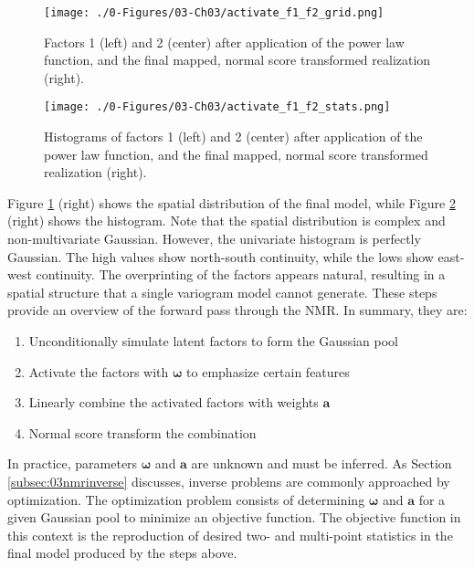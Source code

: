 \begin{figure}[htb!]
    \centering
    \texttt{[image: ./0-Figures/03-Ch03/activate\_f1\_f2\_grid.png]}
    \caption{Factors 1 (left) and 2 (center) after application of the power law function, and the final mapped, normal score transformed realization (right).}
    \label{fig:activate_f1_f2_grid}
\end{figure}

\begin{figure}[htb!]
    \centering
    \texttt{[image: ./0-Figures/03-Ch03/activate\_f1\_f2\_stats.png]}
    \caption{Histograms of factors 1 (left) and 2 (center) after application of the power law function, and the final mapped, normal score transformed realization (right).}
    \label{fig:activate_f1_f2_stats}
\end{figure}

Figure \ref{fig:activate_f1_f2_grid} (right) shows the spatial distribution of the final model, while Figure \ref{fig:activate_f1_f2_stats} (right) shows the histogram. Note that the spatial distribution is complex and non-multivariate Gaussian. However, the univariate histogram is perfectly Gaussian. The high values show north-south continuity, while the lows show east-west continuity. The overprinting of the factors appears natural, resulting in a spatial structure that a single variogram model cannot generate. These steps provide an overview of the forward pass through the \gls{NMR}. In summary, they are:
\begin{enumerate}[noitemsep]
    \item Unconditionally simulate latent factors to form the Gaussian pool
    \item Activate the factors with $\boldsymbol{\omega}$ to emphasize certain features
    \item Linearly combine the activated factors with weights $\mathbf{a}$
    \item Normal score transform the combination
\end{enumerate}

In practice, parameters $\boldsymbol{\omega}$ and $\mathbf{a}$ are unknown and must be inferred. As Section \ref{subsec:03nmrinverse} discusses, inverse problems are commonly approached by optimization. The optimization problem consists of determining $\boldsymbol{\omega}$ and $\mathbf{a}$ for a given Gaussian pool to minimize an objective function. The objective function in this context is the reproduction of desired two- and multi-point statistics in the final model produced by the steps above.

